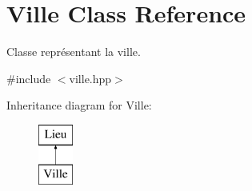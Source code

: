 \hypertarget{class_ville}{\section{Ville Class Reference}
\label{class_ville}
}


Classe représentant la ville.  




{\ttfamily \#include $<$ville.\-hpp$>$}

Inheritance diagram for Ville\-:\begin{figure}[H]
\begin{center}
\leavevmode
\includegraphics[height=2.000000cm]{class_ville}
\end{center}
\end{figure}
